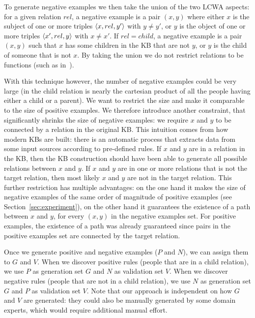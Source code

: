 To generate negative examples we then take the union of the two LCWA aspects: for a given relation $rel$, a negative example is a pair $(x,y)$ where either $x$ is the subject of one or more triples $\langle x,rel,y'\rangle$ with $y \neq y'$, or $y$ is the object of one or more triples $\langle x',rel,y\rangle$ with $x \neq x'$. If $rel=child$, a negative example is a pair $(x,y)$ such that $x$ has some children in the KB that are not $y$, or $y$ is the child of someone that is not $x$. By taking the union we do not restrict relations to be functions (such as in~\cite{galarraga2015fast}). 

With this technique however, the number of negative examples could be very large (in the child relation is nearly the cartesian product of all the people having either a child or a parent). We want to restrict the size and make it comparable to the size of positive examples. We therefore introduce another constraint, that significantly shrinks the size of negative examples: we require $x$ and $y$ to be connected by a relation in the original KB. This intuition comes from how modern KBs are built: there is an automatic process that extracts data from some input sources according to pre-defined rules. If $x$ and $y$ are in a relation in the KB, then the KB construction should have been able to generate all possible relations between $x$ and $y$. If $x$ and $y$ are in one or more relations that is not the target relation, then most likely $x$ and $y$ are not in the target relation. This further restriction has multiple advantages: on the one hand it makes the size of negative examples of the same order of magnitude of positive examples (see Section~\ref{sec:experiment}), on the other hand it guarantees the existence of a path between $x$ and $y$, for every $(x,y)$ in the negative examples set. For positive examples, the existence of a path was already guaranteed since pairs in the positive examples set are connected by the target relation.

Once we generate positive and negative examples ($P$ and $N$), we can assign them to $G$ and $V$. When we discover positive rules (people that are in a child relation), we use $P$ as generation set $G$ and $N$ as validation set $V$. When we discover negative rules (people that are not in a child relation), we use $N$ as generation set $G$ and $P$ as validation set $V$. Note that our approach is independent on how $G$ and $V$ are generated: they could also be manually generated by some domain experts, which would require additional manual effort.

